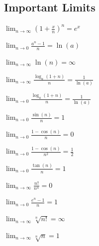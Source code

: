 \documentclass[8pt,a4paper]{extarticle}     %
\theoremstyle{definition}
\theoremstyle{definition}
\theoremstyle{definition}
\begin{document}
\begin{multicols}{4}
\subsection{Important Limits}
\begin{bulletlist}
	\item $\displaystyle\lim_{n \to \infty}\left(1 + \frac{x}{n}\right)^n = e^x$
	\item $\displaystyle\lim_{n \to 0} \frac{a^n-1}{n} = \ln(a)$
	\item $\displaystyle\lim_{n \to \infty} \ln(n) = \infty$
	\item $\displaystyle\lim_{n \to \infty} \frac{\log_{a}(1+n)}{n} = \frac{1}{\ln(a)}$
	\item $\displaystyle\lim_{n \to 0} \frac{\log_{a}(1+n)}{n} = \frac{1}{\ln(a)}$
	\item $\displaystyle\lim_{n \to 0} \frac{\sin(n)}{n} = 1$
	\item $\displaystyle\lim_{n \to 0} \frac{1-\cos(n)}{n} = 0$
	\item $\displaystyle\lim_{n \to 0} \frac{1-\cos(n)}{n^2} = \frac{1}{2}$
	\item $\displaystyle\lim_{n \to 0} \frac{\tan(n)}{n} = 1$
	\item $\displaystyle\lim_{n \to \infty} \frac{n!}{n^n} = 0$
	\item $\displaystyle\lim_{n \to 0} \frac{e^n-1}{n} = 1$
	\item $\displaystyle\lim_{n \to \infty} \sqrt[n]{n!} = \infty$
	\item $\displaystyle\lim_{n \to \infty} \sqrt[n]{n} = 1$
\end{bulletlist}

\end{multicols}
\end{document}
